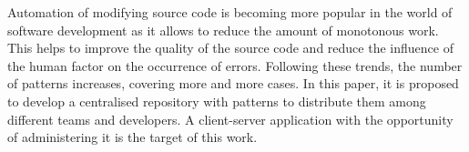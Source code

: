 \documentclass[letterpaper, 10 pt, conference]{ieeeconf}  %
\begin{document}
Automation of modifying source code is becoming more popular in the world of
software development as it allows to reduce the amount of monotonous work. 
This helps to improve the quality of the source code and reduce the
influence of the human factor on the occurrence of errors. 
Following these trends, the number of patterns increases, covering more 
and more cases. 
In this paper, it is proposed to develop a centralised repository with 
patterns to distribute them among different teams and developers. 
A client-server application with the opportunity of administering it is the
target of this work.

\addtolength{\textheight}{-12cm}   %







\end{document}
